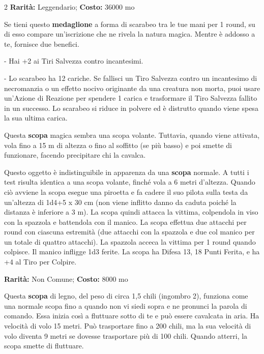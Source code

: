 \begin{multicols}{2}
\textbf{Rarità:} Leggendario; \textbf{Costo:} 36000 mo

Se tieni questo \textbf{medaglione} a forma di scarabeo tra le tue mani per 1 round, su di esso compare un'iscrizione che ne rivela la natura magica. Mentre è addosso a te, fornisce due benefici.

- Hai +2 ai Tiri Salvezza contro incantesimi.

- Lo scarabeo ha 12 cariche. Se fallisci un Tiro Salvezza contro un incantesimo di necromanzia o un effetto nocivo originante da una creatura non morta, puoi usare un'Azione di Reazione per spendere 1 carica e trasformare il Tiro Salvezza fallito in un successo. Lo scarabeo si riduce in polvere ed è distrutto quando viene spesa la sua ultima carica.


Questa \textbf{scopa} magica sembra una scopa volante. Tuttavia, quando viene attivata, vola fino a 15 m di altezza o fino al soffitto (se più basso) e poi smette di funzionare, facendo precipitare chi la cavalca.


Questo oggetto è indistinguibile in apparenza da una \textbf{scopa} normale. A tutti i test risulta identica a una scopa volante, finché vola a 6 metri d'altezza. Quando ciò avviene la scopa esegue una piroetta e fa cadere il suo pilota sulla testa da un'altezza di 1d4+5 x 30 cm (non viene inflitto danno da caduta poiché la distanza è inferiore a 3 m). La scopa quindi attacca la vittima, colpendola in viso con la spazzola e battendola con il manico. La scopa effettua due attacchi per round con ciascuna estremità (due attacchi con la spazzola e due col manico per un totale di quattro attacchi). La spazzola acceca la vittima per 1 round quando colpisce. Il manico infligge 1d3 ferite. La scopa ha Difesa 13, 18 Punti Ferita, e ha +4 al Tiro per Colpire.


\textbf{Rarità:} Non Comune; \textbf{Costo:} 8000 mo

Questa \textbf{scopa} di legno, del peso di circa 1,5 chili (ingombro 2), funziona come una normale scopa fino a quando non vi siedi sopra e ne pronunci la parola di comando. Essa inizia così a fluttuare sotto di te e può essere cavalcata in aria. Ha velocità di volo 15 metri. Può trasportare fino a 200 chili, ma la sua velocità di volo diventa 9 metri se dovesse trasportare più di 100 chili. Quando atterri, la scopa smette di fluttuare.


\end{multicols}
